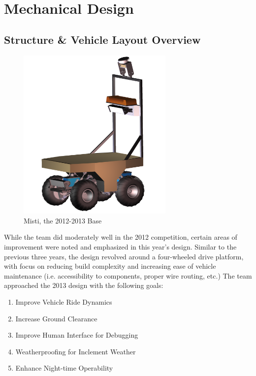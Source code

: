 \section{Mechanical Design}

\subsection{Structure \& Vehicle Layout Overview}


\begin{figure}[H]
\begin{center}
\includegraphics[width=3in]{./Pics/Misti_Vehicle.png}
\caption{Misti, the 2012-2013 Base}

\label{FIG:Misti}
\end{center}
\end{figure}

While the team did moderately well in the 2012 competition, certain areas of improvement were noted and emphasized in this year’s design. Similar to the previous three years, the design revolved around a four-wheeled drive platform, with focus on reducing build complexity and increasing ease of vehicle maintenance (i.e. accessibility to components, proper wire routing, etc.) The team approached the 2013 design with the following goals:

\begin{enumerate}
\item Improve Vehicle Ride Dynamics
\item Increase Ground Clearance
\item Improve Human Interface for Debugging
\item Weatherproofing for Inclement Weather 
\item Enhance Night-time Operability
\end{enumerate}

